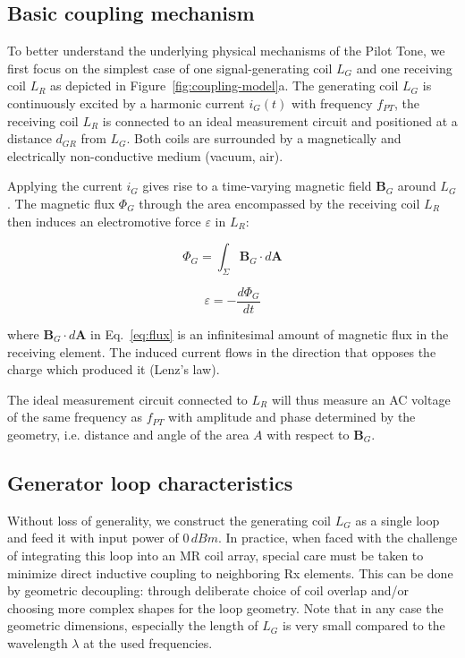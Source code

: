 \documentclass[
]{article}
\begin{document}
\subsection{Basic coupling mechanism}\label{basic-coupling}

To better understand the underlying physical mechanisms of the Pilot
Tone, we first focus on the simplest case of one signal-generating coil
$L_{G}$ and one receiving coil $L_{R}$ as depicted in Figure~\ref{fig:coupling-model}a. The
generating coil $L_{G}$ is continuously excited by a harmonic current
$i_{G}(t)$ with frequency $f_{PT}$, the receiving coil $L_{R}$ is
connected to an ideal measurement circuit and positioned at a distance
$d_{GR}$ from $L_{G}$. Both coils are surrounded by a magnetically
and electrically non-conductive medium (vacuum, air).~

Applying the current $i_{G}$ gives rise to a time-varying magnetic
field $\mathbf{B}_{G}$ around $L_{G}$. The magnetic flux
$\Phi_{G}$ through the area encompassed by the receiving coil
$L_{R}$ then induces an electromotive force $\varepsilon$ in
$L_{R}$:

\begin{equation}
\label{eq:flux}
\Phi_{G} = \int_{\Sigma}\mathbf{B}_{G} \cdot d\mathbf{A}
\end{equation}

\begin{equation}
\label{eq:faraday}
\varepsilon = -\frac{d\Phi_{G}}{dt}
\end{equation}

where $\mathbf{B}_{G} \cdot d\mathbf{A}$ in Eq.~\eqref{eq:flux} is an infinitesimal amount
of magnetic flux in the receiving element. The induced current flows in
the direction that opposes the charge which produced it (Lenz's law).

The ideal measurement circuit connected to $L_{R}$ will thus measure
an AC voltage of the same frequency as $f_{PT}$ with amplitude and
phase determined by the geometry, i.e. distance and angle of the area
$A$ with respect to $\mathbf{B}_{G}$.

\subsection{Generator loop
characteristics}\label{generator-loop-characteristics}

Without loss of generality, we construct the generating coil $L_{G}$
as a single loop and feed it with input power of $0\,dBm$. In
practice, when faced with the challenge of integrating this loop into an
MR coil array, special care must be taken to minimize direct inductive
coupling to neighboring Rx elements. This can be done by geometric
decoupling: through deliberate choice of coil overlap and/or
choosing more complex shapes for the loop geometry. Note that in any
case the geometric dimensions, especially the length of $L_{G}$ is
very small compared to the wavelength $\lambda$ at the used
frequencies.
\end{document}
